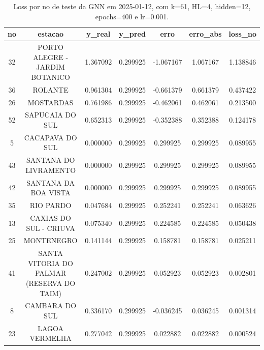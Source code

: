 \begin{table}[h]
\centering
\caption{Loss por no de teste da GNN em 2025-01-12, com k=61, HL=4, hidden=12, epochs=400 e lr=0.001.}
\label{tab:gnn_loss_k61_hl4_h12_e400_d20250112}
\begin{tabular}{ccccccc}
\toprule
no & estacao & y\_real & y\_pred & erro & erro\_abs & loss\_no \\
\midrule
32 & PORTO ALEGRE - JARDIM BOTANICO & 1.367092 & 0.299925 & -1.067167 & 1.067167 & 1.138846 \\
36 & ROLANTE & 0.961304 & 0.299925 & -0.661379 & 0.661379 & 0.437422 \\
26 & MOSTARDAS & 0.761986 & 0.299925 & -0.462061 & 0.462061 & 0.213500 \\
52 & SAPUCAIA DO SUL & 0.652313 & 0.299925 & -0.352388 & 0.352388 & 0.124178 \\
5 & CACAPAVA DO SUL & 0.000000 & 0.299925 & 0.299925 & 0.299925 & 0.089955 \\
43 & SANTANA DO LIVRAMENTO & 0.000000 & 0.299925 & 0.299925 & 0.299925 & 0.089955 \\
42 & SANTANA DA BOA VISTA & 0.000000 & 0.299925 & 0.299925 & 0.299925 & 0.089955 \\
35 & RIO PARDO & 0.047684 & 0.299925 & 0.252241 & 0.252241 & 0.063626 \\
13 & CAXIAS DO SUL - CRIUVA & 0.075340 & 0.299925 & 0.224585 & 0.224585 & 0.050438 \\
25 & MONTENEGRO & 0.141144 & 0.299925 & 0.158781 & 0.158781 & 0.025211 \\
41 & SANTA VITORIA DO PALMAR (RESERVA DO TAIM) & 0.247002 & 0.299925 & 0.052923 & 0.052923 & 0.002801 \\
8 & CAMBARA DO SUL & 0.336170 & 0.299925 & -0.036245 & 0.036245 & 0.001314 \\
23 & LAGOA VERMELHA & 0.277042 & 0.299925 & 0.022882 & 0.022882 & 0.000524 \\
\bottomrule
\end{tabular}
\end{table}
